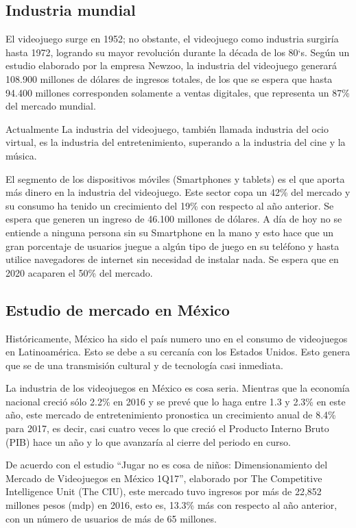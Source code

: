 \subsection{Industria mundial}
			 
			 El videojuego surge en 1952; no obstante, el videojuego como industria surgiría hasta 1972, logrando su mayor revolución durante la década de los 80`s. 
			 Según un estudio elaborado por la empresa Newzoo, la industria del videojuego generará 108.900 millones de dólares de ingresos totales, de los que se espera que hasta 94.400 millones corresponden solamente a ventas digitales, que representa un 87\% del mercado mundial.
			 
			 Actualmente La industria del videojuego, también llamada industria del ocio virtual, es la industria del entretenimiento, superando a la industria del cine y la música.	
			 
			 El segmento de los dispositivos móviles (Smartphones y tablets) es el que aporta más dinero en la industria del videojuego. Este sector copa un 42\% del mercado y su consumo ha tenido un crecimiento del 19\% con respecto al año anterior. Se espera que generen un ingreso de 46.100 millones de dólares. A día de hoy no se entiende a ninguna persona sin su Smartphone en la mano y esto hace que un gran porcentaje de usuarios juegue a algún tipo de juego en su teléfono y hasta utilice navegadores de internet sin necesidad de instalar nada. Se espera que en 2020 acaparen el 50\% del mercado.
			 
\subsection{Estudio de mercado en México}

Históricamente, México ha sido el país numero uno en el consumo de videojuegos en Latinoamérica. Esto se debe a su cercanía con los Estados Unidos. Esto genera que se de una transmisión cultural y de tecnología casi inmediata.

La industria de los videojuegos en México es cosa seria. Mientras que la economía nacional creció sólo 2.2\% en 2016 y se prevé que lo haga entre 1.3 y 2.3\% en este año, este mercado de entretenimiento pronostica un crecimiento anual de 8.4\% para 2017, es decir, casi cuatro veces lo que creció el Producto Interno Bruto (PIB) hace un año y lo que avanzaría al cierre del periodo en curso.

De acuerdo con el estudio “Jugar no es cosa de niños: Dimensionamiento del Mercado de Videojuegos en México 1Q17”, elaborado por The Competitive Intelligence Unit (The CIU), este mercado tuvo ingresos por más de 22,852 millones pesos (mdp) en 2016, esto es, 13.3\% más con respecto al año anterior, con un número de usuarios de más de 65 millones.

